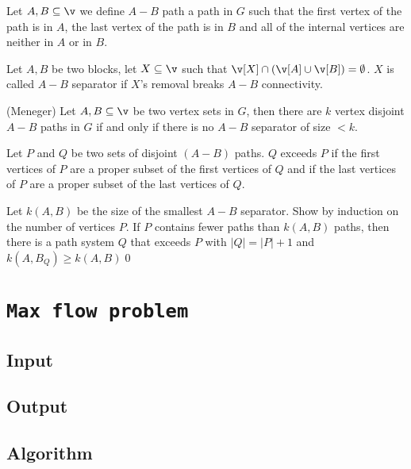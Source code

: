 \begin{definition}[$A - B$ path]
    Let $A, B \subseteq \v$ we define $A - B$ path a path in $G$ such that the first vertex of the path is in $A$, the last vertex of the path is in $B$ and all of the internal vertices are neither in $A$ or in $B$.    
\end{definition}
\begin{definition}[$A - B$ separator]
    Let $A, B$ be two blocks, let $X \subseteq \v$ such that $\v[X] \cap (\v[A] \cup \v[B]) = \emptyset$. $X$ is called $A - B$ separator if $X$'s  removal breaks $A - B$ connectivity.
\end{definition}
\begin{customtheorem}{(Meneger)}
\label{theorem:meneger}
    Let $A, B \subseteq \v$ be two vertex sets in $G$, then there are $k$ vertex disjoint $A - B$ paths in $G$ if and only if there is no $A - B$ separator of size $< k$.
\end{customtheorem}
\begin{prf}
    Let $P$ and $Q$ be two sets of disjoint $(A - B)$ paths. $Q$ exceeds $P$ if the first vertices of $P$ are a proper subset of the first vertices of $Q$ and if the last vertices of $P$ are a proper subset of the last vertices of $Q$.

    Let $k(A, B)$ be the size of the smallest $A - B$ separator. Show by induction on the number of vertices $P$. If $P$ contains fewer paths than $k(A, B)$ paths, then there is a path system $Q$ that exceeds $P$ with $|Q| = |P| + 1$ and $k(A, B_Q) \geq k(A, B)$\qed
\end{prf}
\section{\texttt{Max flow problem}}
\subsection{Input}
\subsection{Output}
\subsection{Algorithm}
